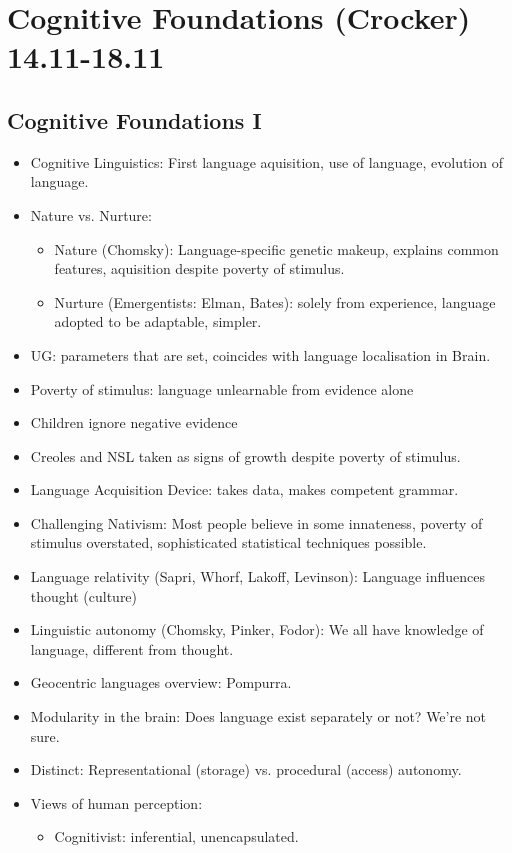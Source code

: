 \documentclass[11pt]{article}
\newenvironment{itemise}{
\begin{itemize}
  \setlength{\itemsep}{1pt}
  \setlength{\parskip}{0pt}
  \setlength{\parsep}{0pt}
}{\end{itemize}}
\begin{document}
\newpage\section{ Cognitive Foundations (Crocker) 14.11-18.11}
\subsection{Cognitive Foundations I}
\begin{itemise}
 \item Cognitive Linguistics: First language aquisition, use of language, evolution of language.
 \item Nature vs. Nurture:
 \begin{itemise}
	\item Nature (Chomsky): Language-specific genetic makeup, explains common features, aquisition despite poverty of stimulus.
	\item Nurture (Emergentists: Elman, Bates): solely from experience, language adopted to be adaptable, simpler.
 \end{itemise}
 \item UG: parameters that are set, coincides with language localisation in Brain.
 \item Poverty of stimulus: language unlearnable from evidence alone
 \item Children ignore negative evidence
 \item Creoles and NSL taken as signs of growth despite poverty of stimulus.
 \item Language Acquisition Device: takes data, makes competent grammar.
 \item Challenging Nativism: Most people believe in some innateness, poverty of stimulus overstated, sophisticated statistical techniques possible.
 \item Language relativity (Sapri, Whorf, Lakoff, Levinson): Language influences thought (culture)
 \item Linguistic autonomy (Chomsky, Pinker, Fodor): We all have knowledge of language, different from thought.
 \item Geocentric languages overview: Pompurra.
 \item Modularity in the brain: Does language exist separately or not? We're not sure.
 \item Distinct: Representational (storage) vs. procedural (access)  autonomy.
 \item Views of human perception:
 \begin{itemise} 
 \item Cognitivist: inferential, unencapsulated. 

\end{itemise}
\end{itemise}
\end{document}
